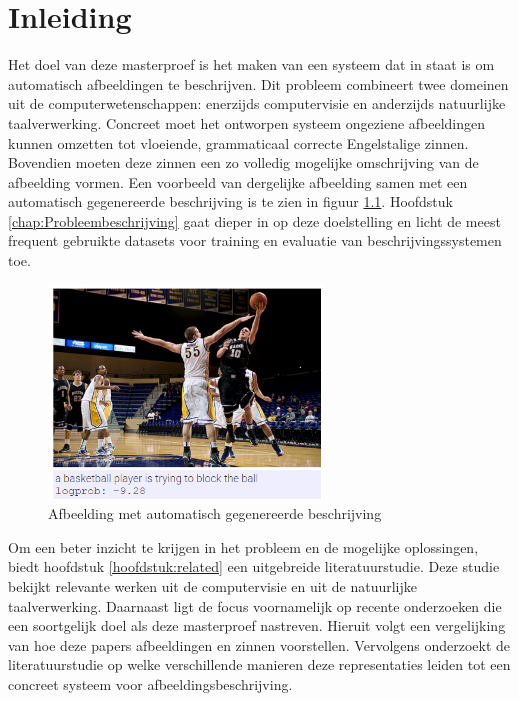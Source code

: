 \chapter{Inleiding}
\label{inleiding}
Het doel van deze masterproef is het maken van een systeem dat in staat is om automatisch afbeeldingen te beschrijven. Dit probleem combineert twee domeinen uit de computerwetenschappen: enerzijds computervisie en anderzijds natuurlijke taalverwerking. Concreet moet het ontworpen systeem ongeziene afbeeldingen kunnen omzetten tot vloeiende, grammaticaal correcte Engelstalige zinnen. Bovendien moeten deze zinnen een zo volledig mogelijke omschrijving van de afbeelding vormen. Een voorbeeld van dergelijke afbeelding samen met een automatisch gegenereerde beschrijving is te zien in figuur \ref{fig:example_img}. Hoofdstuk \ref{chap:Probleembeschrijving} gaat dieper in op deze doelstelling en licht de meest frequent gebruikte datasets voor training en evaluatie van beschrijvingssystemen toe.

\begin{figure}[tb]
    \centering
    \includegraphics[width=0.65\textwidth]{Images/Results/Perfect/blocking_the_ball}
    \caption{Afbeelding met automatisch gegenereerde beschrijving}
    \label{fig:example_img}
\end{figure}

Om een beter inzicht te krijgen in het probleem en de mogelijke oplossingen, biedt hoofdstuk \ref{hoofdstuk:related} een uitgebreide literatuurstudie. Deze studie bekijkt relevante werken uit de computervisie en uit de natuurlijke taalverwerking. Daarnaast ligt de focus voornamelijk op recente onderzoeken die een soortgelijk doel als deze masterproef nastreven. Hieruit volgt een vergelijking van hoe deze papers afbeeldingen en zinnen voorstellen. Vervolgens onderzoekt de literatuurstudie op welke verschillende manieren deze representaties leiden tot een concreet systeem voor afbeeldingsbeschrijving.

